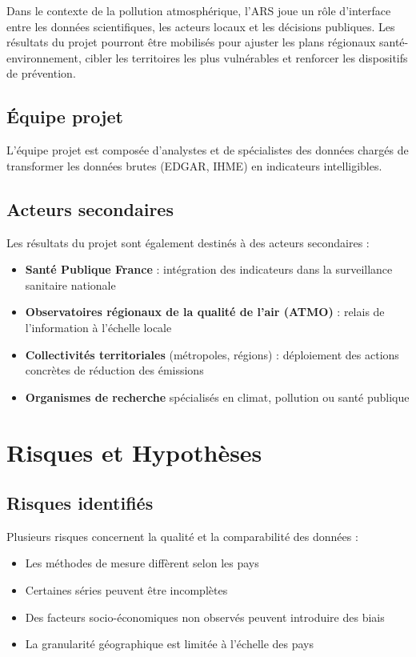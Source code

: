 \documentclass[11pt,a4paper]{article}
\begin{document}
Dans le contexte de la pollution atmosphérique, l'ARS joue un rôle d'interface entre les données scientifiques, les acteurs locaux et les décisions publiques. Les résultats du projet pourront être mobilisés pour ajuster les plans régionaux santé-environnement, cibler les territoires les plus vulnérables et renforcer les dispositifs de prévention.

\subsection{Équipe projet}

L'équipe projet est composée d'analystes et de spécialistes des données chargés de transformer les données brutes (EDGAR, IHME) en indicateurs intelligibles.

\subsection{Acteurs secondaires}

Les résultats du projet sont également destinés à des acteurs secondaires :
\begin{itemize}[noitemsep]
    \item \textbf{Santé Publique France} : intégration des indicateurs dans la surveillance sanitaire nationale
    \item \textbf{Observatoires régionaux de la qualité de l'air (ATMO)} : relais de l'information à l'échelle locale
    \item \textbf{Collectivités territoriales} (métropoles, régions) : déploiement des actions concrètes de réduction des émissions
    \item \textbf{Organismes de recherche} spécialisés en climat, pollution ou santé publique
\end{itemize}

\section{Risques et Hypothèses}

\subsection{Risques identifiés}

Plusieurs risques concernent la qualité et la comparabilité des données :
\begin{itemize}[noitemsep]
    \item Les méthodes de mesure diffèrent selon les pays
    \item Certaines séries peuvent être incomplètes
    \item Des facteurs socio-économiques non observés peuvent introduire des biais
    \item La granularité géographique est limitée à l'échelle des pays
\end{itemize}
\end{document}
